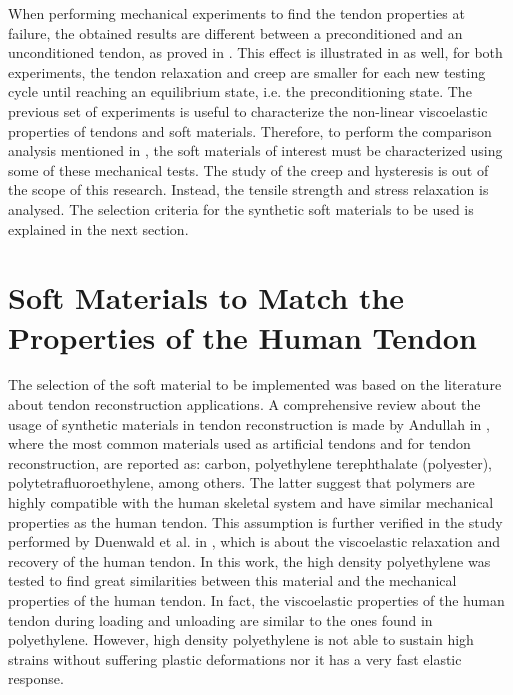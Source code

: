 When performing mechanical experiments to find the tendon properties at failure, the obtained results are different between a preconditioned and an unconditioned tendon, as proved in \cite{schatzmann1998effect}. This effect is illustrated in  as well, for both experiments, the tendon relaxation and creep are smaller for each new testing cycle until reaching an equilibrium state, i.e. the preconditioning state. The previous set of experiments is useful to characterize the non-linear viscoelastic properties of tendons and soft materials. Therefore, to perform the comparison analysis mentioned in , the soft materials of interest must be characterized using some of these mechanical tests. The study of the creep and hysteresis is out of the scope of this research. Instead, the tensile strength and stress relaxation is analysed. The selection criteria for the synthetic soft materials to be used is explained in the next section.

\section{Soft Materials to Match the Properties of the Human Tendon} \label{sec:softMaterials}

The selection of the soft material to be implemented was based on the literature about tendon reconstruction applications. A comprehensive review about the usage of synthetic materials in tendon reconstruction is made by Andullah in \cite{abdullah2015usage}, where the most common materials used as artificial tendons and for tendon reconstruction, are reported as: carbon, polyethylene terephthalate (polyester), polytetrafluoroethylene, among others. The latter suggest that polymers are highly compatible with the human skeletal system and have similar mechanical properties as the human tendon. This assumption is further verified in the study performed by Duenwald et al. in \cite{duenwald2009viscoelastic}, which is about the viscoelastic relaxation and recovery of the human tendon. In this work, the high density polyethylene was tested to find great similarities between this material and the mechanical properties of the human tendon. In fact, the viscoelastic properties of the human tendon during loading and unloading are similar to the ones found in polyethylene. However, high density polyethylene is not able to sustain high strains without suffering plastic deformations nor it has a very fast elastic response.

